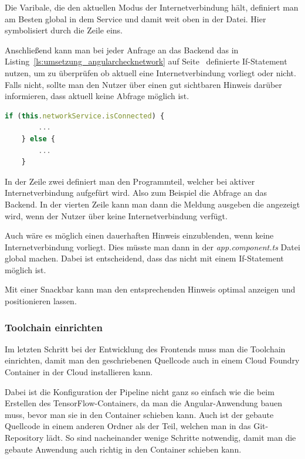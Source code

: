 Die Varibale, die den aktuellen Modus der Internetverbindung hält, definiert man am Besten global in dem Service und
damit weit oben in der Datei. Hier symbolisiert durch die Zeile eins.

Anschließend kann man bei jeder Anfrage an das Backend das in Listing~\ref{ls:umsetzung_angularchecknetwork} auf
Seite~\pageref{ls:umsetzung_angularchecknetwork} definierte If-Statement nutzen, um zu überprüfen ob aktuell eine
Internetverbindung vorliegt oder nicht. Falls nicht, sollte man den Nutzer über einen gut sichtbaren Hinweis darüber
informieren, dass aktuell keine Abfrage möglich ist.

\begin{lstlisting}[language=JavaScript, caption=Überprüfung ob eine Internetverbindung vorliegt, label=ls:umsetzung_angularchecknetwork]
    if (this.networkService.isConnected) {
        ...
    } else {
        ...
    }
\end{lstlisting}

In der Zeile zwei definiert man den Programmteil, welcher bei aktiver Internetverbindung aufgefürt wird. Also zum
Beispiel die Abfrage an das Backend. In der vierten Zeile kann man dann die Meldung ausgeben die angezeigt wird, wenn
der Nutzer über keine Internetverbindung verfügt.

Auch wäre es möglich einen dauerhaften Hinweis einzublenden, wenn keine Internetverbindung vorliegt. Dies müsste man dann
in der \textit{app.component.ts} Datei global machen. Dabei ist entscheidend, dass das nicht mit einem If-Statement
möglich ist.

Mit einer Snackbar kann man den entsprechenden Hinweis optimal anzeigen und positionieren lassen.

\subsubsection{Toolchain einrichten}
Im letzten Schritt bei der Entwicklung des Frontends muss man die Toolchain einrichten, damit man den geschriebenen
Quellcode auch in einem Cloud Foundry Container in der Cloud installieren kann.

Dabei ist die Konfiguration der Pipeline nicht ganz so einfach wie die beim Erstellen des TensorFlow-Containers, da man
die Angular-Anwendung bauen muss, bevor man sie in den Container schieben kann. Auch ist der gebaute Quellcode in einem
anderen Ordner als der Teil, welchen man in das Git-Repository lädt. So sind nacheinander wenige Schritte notwendig,
damit man die gebaute Anwendung auch richtig in den Container schieben kann.

